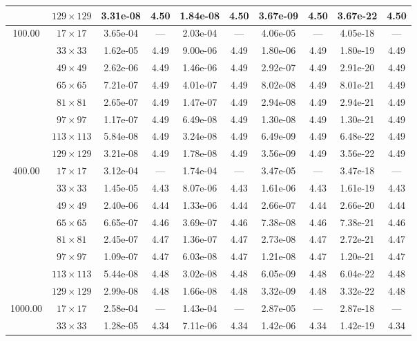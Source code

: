 \documentclass[preprint, 12pt]{elsarticle}
\begin{document}
\begin{center}
\begin{table}[H]
{\begin{tabular*}{\textwidth}{@{\extracolsep\fill}cccccccccc@{}}
    & $129\times 129$ & 3.31e-08 & 4.50 & 1.84e-08 & 4.50 & 3.67e-09 & 4.50 & 3.67e-22 & 4.50 \\
    \hline
    \multirow{7}{*}{100.00} & $17\times 17$ & 3.65e-04 & --- & 2.03e-04 & --- & 4.06e-05 & --- & 4.05e-18 & --- \\
    & $33\times 33$ & 1.62e-05 & 4.49 & 9.00e-06 & 4.49 & 1.80e-06 & 4.49 & 1.80e-19 & 4.49 \\
    & $49\times 49$ & 2.62e-06 & 4.49 & 1.46e-06 & 4.49 & 2.92e-07 & 4.49 & 2.91e-20 & 4.49 \\
    & $65\times 65$ & 7.21e-07 & 4.49 & 4.01e-07 & 4.49 & 8.02e-08 & 4.49 & 8.01e-21 & 4.49 \\
    & $81\times 81$ & 2.65e-07 & 4.49 & 1.47e-07 & 4.49 & 2.94e-08 & 4.49 & 2.94e-21 & 4.49 \\
    & $97\times 97$ & 1.17e-07 & 4.49 & 6.49e-08 & 4.49 & 1.30e-08 & 4.49 & 1.30e-21 & 4.49 \\
    & $113\times 113$ & 5.84e-08 & 4.49 & 3.24e-08 & 4.49 & 6.49e-09 & 4.49 & 6.48e-22 & 4.49 \\
    & $129\times 129$ & 3.21e-08 & 4.49 & 1.78e-08 & 4.49 & 3.56e-09 & 4.49 & 3.56e-22 & 4.49 \\
    \hline
    \multirow{7}{*}{400.00} & $17\times 17$ & 3.12e-04 & --- & 1.74e-04 & --- & 3.47e-05 & --- & 3.47e-18 & --- \\
    & $33\times 33$ & 1.45e-05 & 4.43 & 8.07e-06 & 4.43 & 1.61e-06 & 4.43 & 1.61e-19 & 4.43 \\
    & $49\times 49$ & 2.40e-06 & 4.44 & 1.33e-06 & 4.44 & 2.66e-07 & 4.44 & 2.66e-20 & 4.44 \\
    & $65\times 65$ & 6.65e-07 & 4.46 & 3.69e-07 & 4.46 & 7.38e-08 & 4.46 & 7.38e-21 & 4.46 \\
    & $81\times 81$ & 2.45e-07 & 4.47 & 1.36e-07 & 4.47 & 2.73e-08 & 4.47 & 2.72e-21 & 4.47 \\
    & $97\times 97$ & 1.09e-07 & 4.47 & 6.03e-08 & 4.47 & 1.21e-08 & 4.47 & 1.20e-21 & 4.47 \\
    & $113\times 113$ & 5.44e-08 & 4.48 & 3.02e-08 & 4.48 & 6.05e-09 & 4.48 & 6.04e-22 & 4.48 \\
    & $129\times 129$ & 2.99e-08 & 4.48 & 1.66e-08 & 4.48 & 3.32e-09 & 4.48 & 3.32e-22 & 4.48 \\
    \hline
    \multirow{7}{*}{1000.00} & $17\times 17$ & 2.58e-04 & --- & 1.43e-04 & --- & 2.87e-05 & --- & 2.87e-18 & --- \\
    & $33\times 33$ & 1.28e-05 & 4.34 & 7.11e-06 & 4.34 & 1.42e-06 & 4.34 & 1.42e-19 & 4.34 \\

\end{tabular*}}
\end{table}
\end{center}
\end{document}
